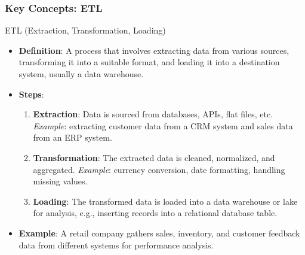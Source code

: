 \documentclass[aspectratio=169]{beamer}
\begin{document}
\begin{frame}[fragile]
    \frametitle{Key Concepts: ETL}
    \begin{block}{ETL (Extraction, Transformation, Loading)}
        \begin{itemize}
            \item \textbf{Definition}: A process that involves extracting data from various sources, transforming it into a suitable format, and loading it into a destination system, usually a data warehouse.
            \item \textbf{Steps}:
            \begin{enumerate}
                \item \textbf{Extraction}: Data is sourced from databases, APIs, flat files, etc. \textit{Example}: extracting customer data from a CRM system and sales data from an ERP system.
                \item \textbf{Transformation}: The extracted data is cleaned, normalized, and aggregated. \textit{Example}: currency conversion, date formatting, handling missing values.
                \item \textbf{Loading}: The transformed data is loaded into a data warehouse or lake for analysis, e.g., inserting records into a relational database table.
            \end{enumerate}
            \item \textbf{Example}: A retail company gathers sales, inventory, and customer feedback data from different systems for performance analysis.
        \end{itemize}
    \end{block}
\end{frame}
\end{document}
